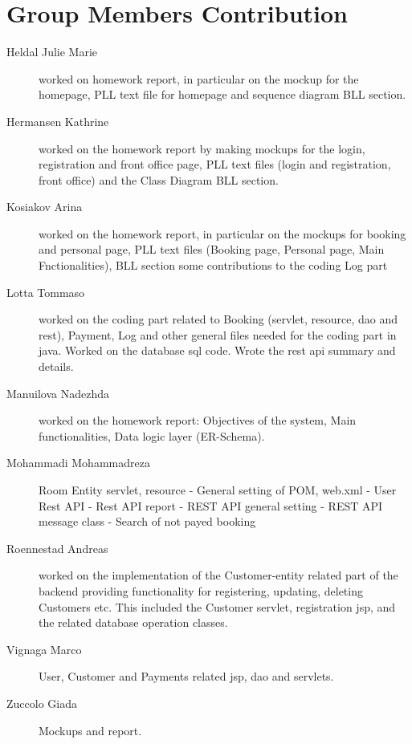 \section{Group Members Contribution}

\begin{description}
	\item[Heldal Julie Marie] worked on homework report, in particular on the mockup for the homepage, PLL text file for homepage and sequence diagram BLL section.
	\item[Hermansen Kathrine] worked on the homework report by making mockups for the login, registration and front office page, PLL text files (login and registration, front office) and the Class Diagram BLL section.
	\item[Kosiakov Arina] worked on the homework report, in particular on the mockups for booking and personal page, PLL text files (Booking page, Personal page, Main Fnctionalities), BLL section some contributions to the coding Log part
	\item[Lotta Tommaso] worked on the coding part related to Booking (servlet, resource, dao and rest), Payment, Log and other general files needed for the coding part in java. Worked on the database sql code. Wrote the rest api summary and details.
	\item[Manuilova Nadezhda] worked on the homework report: Objectives of the system, Main functionalities, Data logic layer (ER-Schema).
	\item[Mohammadi Mohammadreza] Room Entity servlet, resource - General setting of POM, web.xml - User Rest API - Rest API report - REST API general setting - REST API message class - Search of not payed booking
	\item[Roennestad Andreas] worked on the implementation of the Customer-entity related part of the backend providing functionality for registering, updating, deleting Customers etc. This included the Customer servlet, registration jsp, and the related database operation classes.
	\item[Vignaga Marco] User, Customer and Payments related jsp, dao and servlets.
	\item[Zuccolo Giada] Mockups and report.
\end{description}


